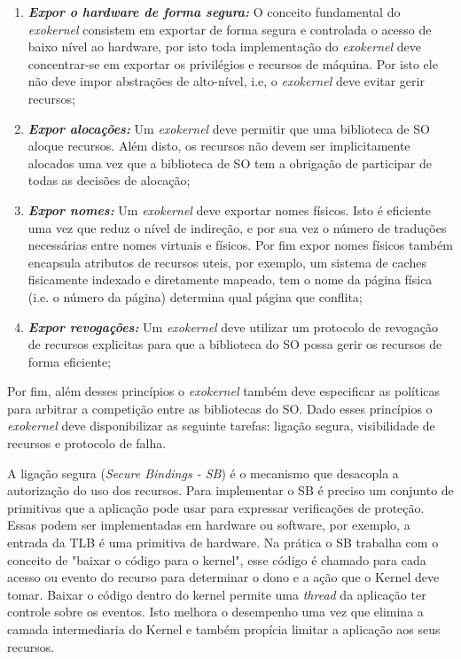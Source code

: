 \begin{enumerate}
  \item \textbf{\emph{Expor o hardware de forma segura:}} O conceito
        fundamental do \emph{exokernel} consistem em exportar de forma segura
        e controlada o acesso de baixo nível ao hardware, por isto toda
        implementação do \emph{exokernel} deve concentrar-se em exportar os
        privilégios e recursos de máquina. Por isto ele não deve impor
        abstrações de alto-nível, i.e, o \emph{exokernel} deve evitar gerir
        recursos;
  \item \textbf{\emph{Expor alocações:}} Um \emph{exokernel} deve permitir que
        uma biblioteca de SO aloque recursos. Além disto, os recursos não devem
        ser implicitamente alocados uma vez que a biblioteca de SO tem a
        obrigação de participar de todas as decisões de alocação;
  \item \textbf{\emph{Expor nomes:}} Um \emph{exokernel} deve exportar nomes
        físicos. Isto é eficiente uma vez que reduz o nível de indireção, e por
        sua vez o número de traduções necessárias entre nomes virtuais e
        físicos. Por fim expor nomes físicos também encapsula atributos de
        recursos uteis, por exemplo, um sistema de caches fisicamente indexado
        e diretamente mapeado, tem o nome da página física (i.e. o número da
        página) determina qual página que conflita;
  \item \textbf{\emph{Expor revogações:}} Um \emph{exokernel} deve utilizar um
        protocolo de revogação de recursos explicitas para que a biblioteca do
        SO possa gerir os recursos de forma eficiente;
\end{enumerate}

Por fim, além desses princípios o \emph{exokernel} também deve especificar as
políticas para arbitrar a competição entre as bibliotecas do SO. Dado esses
princípios o \emph{exokernel} deve disponibilizar as seguinte tarefas: ligação
segura, visibilidade de recursos e protocolo de falha.

A ligação segura (\emph{Secure Bindings - SB}) é o mecanismo que desacopla a
autorização do uso dos recursos. Para implementar o SB é preciso um conjunto de
primitivas que a aplicação pode usar para expressar verificações de proteção.
Essas podem ser implementadas em hardware ou software, por exemplo, a entrada
da TLB é uma primitiva de hardware. Na prática o SB trabalha com o conceito de
"baixar o código para o kernel", esse código é chamado para cada acesso ou
evento do recurso para determinar o dono e a ação que o Kernel deve tomar.
Baixar o código dentro do kernel permite uma \emph{thread} da aplicação ter controle
sobre os eventos. Isto melhora o desempenho uma vez que elimina a camada
intermediaria do Kernel e também propícia limitar a aplicação aos seus
recursos.

